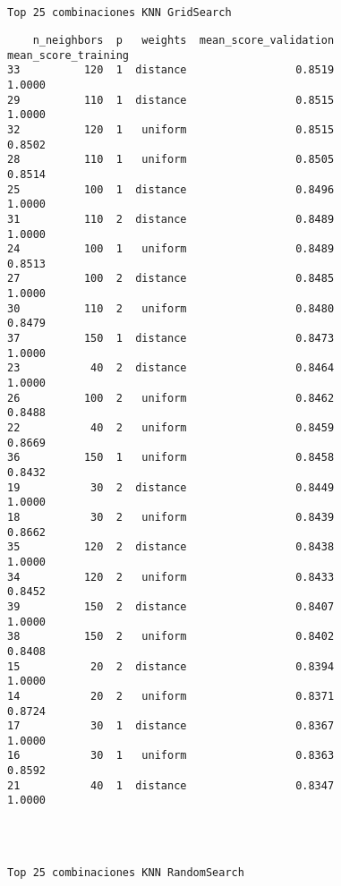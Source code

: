 \documentclass[11pt]{article}
\begin{document}
    \begin{Verbatim}[commandchars=\\\{\}]
 
 
Top 25 combinaciones KNN GridSearch

    \end{Verbatim}

    
    \begin{verbatim}
    n_neighbors  p   weights  mean_score_validation  mean_score_training
33          120  1  distance                 0.8519               1.0000
29          110  1  distance                 0.8515               1.0000
32          120  1   uniform                 0.8515               0.8502
28          110  1   uniform                 0.8505               0.8514
25          100  1  distance                 0.8496               1.0000
31          110  2  distance                 0.8489               1.0000
24          100  1   uniform                 0.8489               0.8513
27          100  2  distance                 0.8485               1.0000
30          110  2   uniform                 0.8480               0.8479
37          150  1  distance                 0.8473               1.0000
23           40  2  distance                 0.8464               1.0000
26          100  2   uniform                 0.8462               0.8488
22           40  2   uniform                 0.8459               0.8669
36          150  1   uniform                 0.8458               0.8432
19           30  2  distance                 0.8449               1.0000
18           30  2   uniform                 0.8439               0.8662
35          120  2  distance                 0.8438               1.0000
34          120  2   uniform                 0.8433               0.8452
39          150  2  distance                 0.8407               1.0000
38          150  2   uniform                 0.8402               0.8408
15           20  2  distance                 0.8394               1.0000
14           20  2   uniform                 0.8371               0.8724
17           30  1  distance                 0.8367               1.0000
16           30  1   uniform                 0.8363               0.8592
21           40  1  distance                 0.8347               1.0000
    \end{verbatim}

    
    \begin{Verbatim}[commandchars=\\\{\}]
 
 
 
Top 25 combinaciones KNN RandomSearch

    \end{Verbatim}
\end{document}
